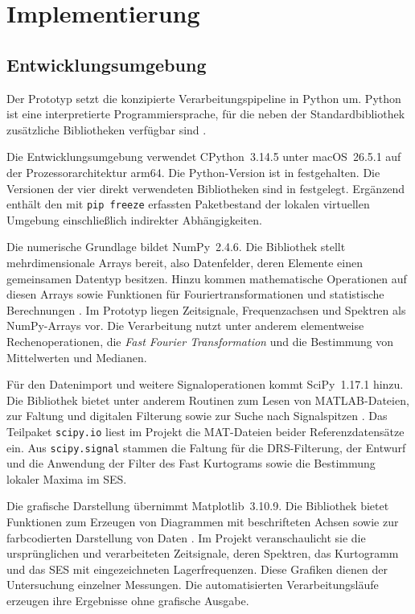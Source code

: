 \chapter{Implementierung}
\label{ch:implementierung}


\section{Entwicklungsumgebung}
\label{sec:softwareumgebung_impl}


Der Prototyp setzt die konzipierte Verarbeitungspipeline in Python um.
Python ist eine interpretierte Programmiersprache, für die neben der
Standardbibliothek zusätzliche Bibliotheken verfügbar sind
\cite{zotero-item-95}.

Die Entwicklungsumgebung verwendet CPython~3.14.5
unter macOS~26.5.1 auf der Prozessorarchitektur arm64.
Die Python-Version ist in  festgehalten.
Die Versionen der vier direkt verwendeten Bibliotheken sind in
 festgelegt. Ergänzend enthält
 den mit \texttt{pip freeze} erfassten
Paketbestand der lokalen virtuellen Umgebung einschließlich indirekter
Abhängigkeiten.

Die numerische Grundlage bildet NumPy~2.4.6. Die Bibliothek stellt
mehrdimensionale Arrays bereit, also Datenfelder, deren Elemente einen
gemeinsamen Datentyp besitzen. Hinzu kommen mathematische Operationen auf
diesen Arrays sowie Funktionen für Fouriertransformationen und statistische
Berechnungen \cite{numpydevelopersWhatNumPy}.
Im Prototyp liegen Zeitsignale, Frequenzachsen und Spektren als NumPy-Arrays
vor. Die Verarbeitung nutzt unter anderem elementweise Rechenoperationen,
die \textit{Fast Fourier Transformation} und die Bestimmung von Mittelwerten und
Medianen.

Für den Datenimport und weitere Signaloperationen kommt SciPy~1.17.1 hinzu.
Die Bibliothek bietet unter anderem Routinen zum Lesen von MATLAB-Dateien,
zur Faltung und digitalen Filterung sowie zur Suche nach Signalspitzen
\cite{thescipycommunitySciPyDocumentation2026}.
Das Teilpaket \texttt{scipy.io} liest im Projekt die MAT-Dateien beider
Referenzdatensätze ein. Aus \texttt{scipy.signal} stammen die Faltung für die
DRS-Filterung, der Entwurf und die Anwendung der Filter des Fast Kurtograms
sowie die Bestimmung lokaler Maxima im \acrshort{SES}.

Die grafische Darstellung übernimmt Matplotlib~3.10.9. Die Bibliothek bietet
Funktionen zum Erzeugen von Diagrammen mit beschrifteten Achsen sowie zur
farbcodierten Darstellung von Daten
\cite{thematplotlibdevelopmentteamQuickStartGuide}.
Im Projekt veranschaulicht sie die ursprünglichen und verarbeiteten
Zeitsignale, deren Spektren, das Kurtogramm und das \acrshort{SES} mit
eingezeichneten Lagerfrequenzen. Diese Grafiken dienen der Untersuchung
einzelner Messungen. Die automatisierten Verarbeitungsläufe erzeugen ihre
Ergebnisse ohne grafische Ausgabe.

